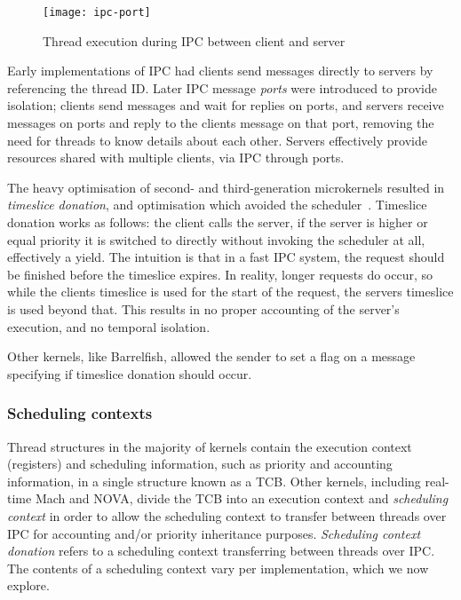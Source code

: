 \begin{figure}
    \centering
    \texttt{[image: ipc-port]}
    \caption{Thread execution during IPC between client and server}
    \label{f:os-ipc}
\end{figure}

Early implementations of IPC had clients send messages directly to servers by referencing the
thread ID. Later IPC message \emph{ports} were introduced to provide isolation; clients send
messages and wait for replies on ports, and servers receive messages on ports and reply to the
clients message on that port, removing the need for threads to know details about each other. 
Servers effectively provide resources shared with multiple clients, via IPC through ports. 

The heavy optimisation of second- and third-generation microkernels resulted in \emph{timeslice
donation}, and optimisation which avoided the scheduler~\citep{Heiser_Elphinstone_16}. 
Timeslice donation works as follows: the client calls the server, if the server is higher or equal
priority it is switched to directly without invoking the scheduler at all, effectively a yield.
The intuition is that in
a fast IPC system, the request should be finished before the timeslice expires. In reality, longer
requests do occur, so while the clients timeslice is used for the start of the request, the servers
timeslice is used beyond that. This results in no
proper accounting of the server's execution, and no temporal isolation.

Other kernels, like Barrelfish, allowed the sender to set a flag on a message specifying if
timeslice donation should occur.

\subsubsection{Scheduling contexts}
\label{s:sc-intro}

Thread structures in the majority of kernels contain the execution context (registers) and scheduling
information, such as priority and accounting information, in a single structure known as a \gls{TCB}.
Other kernels, including real-time Mach and NOVA, divide the TCB into an execution context and
\emph{scheduling context} in order to allow the scheduling context to
transfer between threads over \gls{IPC} for accounting and/or priority inheritance purposes.
\emph{Scheduling context donation} refers to a scheduling context transferring between threads over
\gls{IPC}. The contents of a scheduling context vary per implementation, which we now explore.

